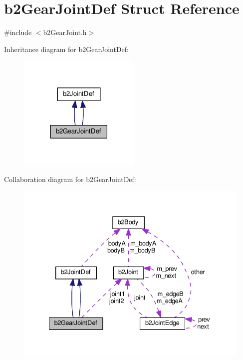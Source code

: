 \hypertarget{structb2GearJointDef}{}\section{b2\+Gear\+Joint\+Def Struct Reference}
\label{structb2GearJointDef}


{\ttfamily \#include $<$b2\+Gear\+Joint.\+h$>$}



Inheritance diagram for b2\+Gear\+Joint\+Def\+:
\nopagebreak
\begin{figure}[H]
\begin{center}
\leavevmode
\includegraphics[width=165pt]{structb2GearJointDef__inherit__graph}
\end{center}
\end{figure}


Collaboration diagram for b2\+Gear\+Joint\+Def\+:
\nopagebreak
\begin{figure}[H]
\begin{center}
\leavevmode
\includegraphics[width=335pt]{structb2GearJointDef__coll__graph}
\end{center}
\end{figure}
